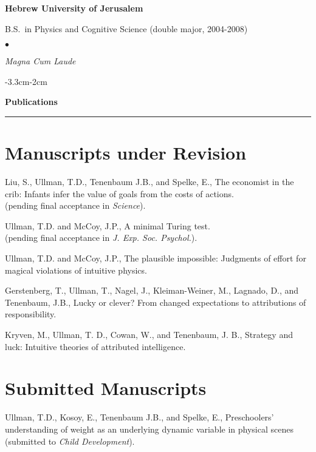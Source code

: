 \documentclass[margin,line,pifont,palatino,courier]{res}
\newenvironment{list1}{
  \begin{list}{\ding{113}}{%
      \setlength{\itemsep}{0in}
      \setlength{\parsep}{0in} \setlength{\parskip}{0in}
      \setlength{\topsep}{0in} \setlength{\partopsep}{0in}
      \setlength{\leftmargin}{0.17in}}}{\end{list}}
\newenvironment{list2}{
  \begin{list}{$\bullet$}{%
      \setlength{\itemsep}{0in}
      \setlength{\parsep}{0in} \setlength{\parskip}{0in}
      \setlength{\topsep}{0in} \setlength{\partopsep}{0in}
      \setlength{\leftmargin}{0.2in}}}{\end{list}}
\begin{document}
\begin{resume}
{\bf Hebrew University of Jerusalem}\\
\vspace*{-.1in}
\begin{list1}
\item[] B.S.~in Physics and Cognitive Science (double major, 2004-2008)

\begin{list2}
\vspace*{.05in}
\item \textit{Magna Cum Laude}
\end{list2}

\end{list1}

\begin{adjustwidth*}{-3.3cm}{-2cm}

\textbf{Publications}\\
\noindent\rule{8cm}{0.4pt}

\end{adjustwidth*}

\section{\sc Manuscripts under Revision}

Liu, S., Ullman, T.D., Tenenbaum J.B., and Spelke, E., The economist in the crib: Infants infer the value of goals from the costs of actions. \\(pending final acceptance in \textit{Science}).

Ullman, T.D. and McCoy, J.P., A minimal Turing test.\\ (pending final acceptance in \textit{J. Exp. Soc. Psychol.}).

Ullman, T.D. and McCoy, J.P., The plausible impossible: Judgments of effort for magical violations of intuitive physics.

Gerstenberg, T., Ullman, T., Nagel, J., Kleiman-Weiner, M., Lagnado, D., and Tenenbaum, J.B., Lucky or clever? From changed expectations to attributions of responsibility.

Kryven, M., Ullman, T. D., Cowan, W., and Tenenbaum, J. B., Strategy and luck: Intuitive theories of attributed intelligence.

\section{\sc Submitted Manuscripts}

Ullman, T.D., Kosoy, E., Tenenbaum J.B., and Spelke, E., Preschoolers' understanding of weight as an underlying dynamic variable in physical scenes (submitted to \textit{Child Development}).


\end{resume}
\end{document}
